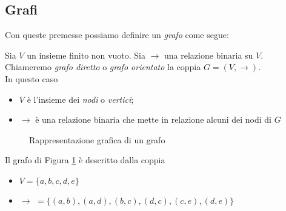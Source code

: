 \subsection{Grafi}
Con queste premesse possiamo definire un \emph{grafo} come segue:
\begin{definition}
    Sia $V$ un insieme finito non vuoto. Sia $\to$ una relazione binaria su $V$.\\
    Chiameremo \emph{grafo diretto} o \emph{grafo orientato} la coppia $G = (V, \to)$.\\
    In questo caso
    \begin{itemize}
        \item $V$ è l'insieme dei \emph{nodi} o \emph{vertici};
        \item $\to$ è una relazione binaria che mette in relazione alcuni dei nodi di $G$
    \end{itemize}
\end{definition}
\begin{example}
    \begin{figure}[b]
        \centering
        \caption{Rappresentazione grafica di un grafo}
        \label{fig:graph}
    \end{figure}
    Il grafo di Figura \ref*{fig:graph} è descritto dalla coppia
    \begin{itemize}
        \item $V = \{a,b,c,d,e\}$
        \item $\to \,\,= \{(a,b), (a,d), (b,c), (d,c), (c,e), (d,e)\}$
    \end{itemize}
\end{example}
